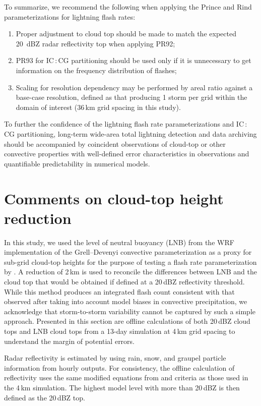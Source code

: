 To summarize, we recommend the following when applying the Prince and Rind
parameterizations for lightning flash rates:
\begin{enumerate}
\item Proper adjustment to cloud top should be made to match the expected 20~\unit{dBZ} radar reflectivity top when applying PR92;
 \item PR93 for IC\,:\,CG partitioning should be used only if it is unnecessary to get information on the frequency distribution of flashes;
  \item Scaling for resolution dependency may be performed by areal ratio against a base-case resolution, defined as that producing 1 storm per grid within the domain of interest (36\,\unit{km} grid spacing in this study).
  \end{enumerate}

To further the confidence of the lightning flash rate parameterizations and
IC\,:\,CG partitioning, long-term wide-area total lightning detection and
data archiving should be accompanied by coincident observations of cloud-top
or other convective properties with well-defined error characteristics in
observations and quantifiable predictability in numerical models.

\appendix

\section{Comments on cloud-top height reduction} \label{apdx:ktop}

In this study, we used the level of neutral buoyancy (LNB) from the WRF
implementation of the Grell--Devenyi convective parameterization
\citep{Grell:2002bs} as a proxy for sub-grid cloud-top heights for the
purpose of testing a flash rate parameterization by
\citet{Price:1992wb,Price:1993fk,Price:1994fk}. A reduction of 2\,\unit{km}
is used to reconcile the differences between LNB and the cloud top that would
be obtained if defined at a 20\,\unit{dBZ} reflectivity threshold.
While this method produces an integrated flash count consistent with that
observed after taking into account model biases in convective precipitation,
we acknowledge that storm-to-storm variability cannot be captured by such a
simple \mbox{approach}. Presented in this section are offline calculations of both
20\,\unit{dBZ} cloud tops and LNB cloud tops from a 13-day simulation at
4\,\unit{km} grid spacing to understand the margin of potential errors.

Radar reflectivity is estimated by using rain, snow, and graupel particle
information from hourly outputs. For consistency, the offline calculation of
reflectivity uses the same modified equations from \citet{Smith:1975fk} and
criteria as those used in the 4\,\unit{km} simulation. The highest model
level with more than 20\,\unit{dBZ} is then defined as the 20\,\unit{dBZ}
top.

